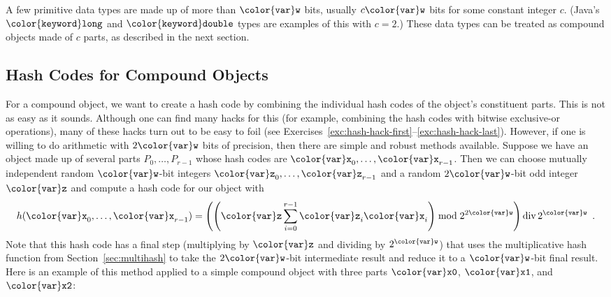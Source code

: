 \documentclass[10pt]{book}
\newcommand{\seclabel}[1]{\label{sec:#1}}
\newcommand{\secref}[1]{Section~\ref{sec:#1}}
\theoremstyle{plain}
\theoremstyle{definition}
\DeclareMathOperator{\ddiv}{div}
\begin{document}
A few primitive data types are made up of more than \ensuremath{\mathtt{{\color{var}w}}} bits, usually
$c\ensuremath{\mathtt{{\color{var}w}}}$ bits for some constant integer $c$. (Java's \ensuremath{\mathtt{{\color{keyword}long}}} and \ensuremath{\mathtt{{\color{keyword}double}}}
types are examples of this with $c=2$.)  These data types can be treated
as compound objects made of $c$ parts, as described in the next section.

\subsection{Hash Codes for Compound Objects}
\seclabel{stringhash}

%
For a compound object, we want to create a hash code by combining the
individual hash codes of the object's constituent parts.  This is not
as easy as it sounds.  Although one can find many hacks for this (for
example, combining the hash codes with bitwise exclusive-or operations),
many of these hacks turn out to be easy to foil (see Exercises~\ref{exc:hash-hack-first}--\ref{exc:hash-hack-last}).
However, if one is willing to do arithmetic with $2\ensuremath{\mathtt{{\color{var}w}}}$ bits of
precision, then there are simple and robust methods available.
Suppose we have an object made up of several parts
$P_0,\ldots,P_{r-1}$ whose hash codes are $\ensuremath{\mathtt{{\color{var}x}}}_0,\ldots,\ensuremath{\mathtt{{\color{var}x}}}_{r-1}$.
Then we can choose mutually independent random \ensuremath{\mathtt{{\color{var}w}}}-bit integers
$\ensuremath{\mathtt{{\color{var}z}}}_0,\ldots,\ensuremath{\mathtt{{\color{var}z}}}_{r-1}$ and a random $2\ensuremath{\mathtt{{\color{var}w}}}$-bit odd integer \ensuremath{\mathtt{{\color{var}z}}} and
compute a hash code for our object with
\[
   h(\ensuremath{\mathtt{{\color{var}x}}}_0,\ldots,\ensuremath{\mathtt{{\color{var}x}}}_{r-1}) =  
   \left(\left(\ensuremath{\mathtt{{\color{var}z}}}\sum_{i=0}^{r-1} \ensuremath{\mathtt{{\color{var}z}}}_i \ensuremath{\mathtt{{\color{var}x}}}_i\right)\bmod 2^{2\ensuremath{\mathtt{{\color{var}w}}}}\right)
   \ddiv 2^{\ensuremath{\mathtt{{\color{var}w}}}} \enspace .
\]
Note that this hash code has a final step (multiplying by \ensuremath{\mathtt{{\color{var}z}}} and
dividing by $2^{\ensuremath{\mathtt{{\color{var}w}}}}$) that uses the multiplicative hash function
from \secref{multihash} to take the $2\ensuremath{\mathtt{{\color{var}w}}}$-bit intermediate result and
reduce it to a \ensuremath{\mathtt{{\color{var}w}}}-bit final result.  Here is an example of this method applied to a simple compound object with three parts \ensuremath{\mathtt{{\color{var}x0}}}, \ensuremath{\mathtt{{\color{var}x1}}}, and \ensuremath{\mathtt{{\color{var}x2}}}:
\end{document}
